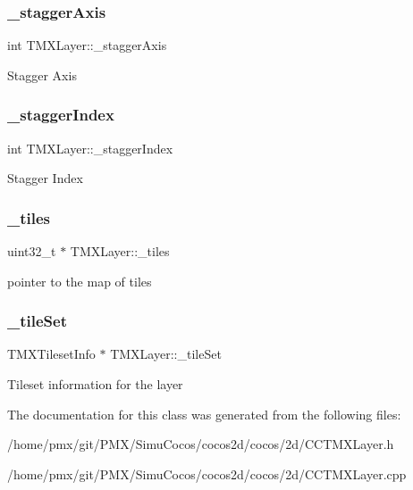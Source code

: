 \subsubsection{\texorpdfstring{\+\_\+stagger\+Axis}{\_staggerAxis}}
{\footnotesize\ttfamily int T\+M\+X\+Layer\+::\+\_\+stagger\+Axis\hspace{0.3cm}{\ttfamily [protected]}}

Stagger Axis \mbox{\label{classTMXLayer_a661239e6226feb85700c856c1c379273}} 
\subsubsection{\texorpdfstring{\+\_\+stagger\+Index}{\_staggerIndex}}
{\footnotesize\ttfamily int T\+M\+X\+Layer\+::\+\_\+stagger\+Index\hspace{0.3cm}{\ttfamily [protected]}}

Stagger Index \mbox{\label{classTMXLayer_a61e9c6961caaa162e77168cc7166d8de}} 
\subsubsection{\texorpdfstring{\+\_\+tiles}{\_tiles}}
{\footnotesize\ttfamily uint32\+\_\+t $\ast$ T\+M\+X\+Layer\+::\+\_\+tiles\hspace{0.3cm}{\ttfamily [protected]}}

pointer to the map of tiles \mbox{\label{classTMXLayer_a19b5b98c2f7a6018e66752b0df696cec}} 
\subsubsection{\texorpdfstring{\+\_\+tile\+Set}{\_tileSet}}
{\footnotesize\ttfamily T\+M\+X\+Tileset\+Info $\ast$ T\+M\+X\+Layer\+::\+\_\+tile\+Set\hspace{0.3cm}{\ttfamily [protected]}}

Tileset information for the layer 

The documentation for this class was generated from the following files\+:\begin{DoxyCompactItemize}
\item 
/home/pmx/git/\+P\+M\+X/\+Simu\+Cocos/cocos2d/cocos/2d/C\+C\+T\+M\+X\+Layer.\+h\item 
/home/pmx/git/\+P\+M\+X/\+Simu\+Cocos/cocos2d/cocos/2d/C\+C\+T\+M\+X\+Layer.\+cpp\end{DoxyCompactItemize}
